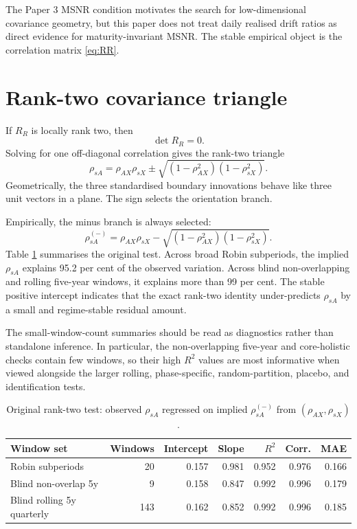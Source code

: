 \documentclass[11pt]{article}
\begin{document}
The Paper 3 MSNR condition motivates the search for low-dimensional covariance geometry, but this paper does not treat daily realised drift ratios as direct evidence for maturity-invariant MSNR. The stable empirical object is the correlation matrix \eqref{eq:RR}.

\section{Rank-two covariance triangle}

If $R_R$ is locally rank two, then
\begin{equation}
 \det R_R=0.
\end{equation}
Solving for one off-diagonal correlation gives the rank-two triangle
\begin{equation}
 \rho_{sA}
 =
 \rho_{AX}\rho_{sX}
 \pm
 \sqrt{(1-\rho_{AX}^2)(1-\rho_{sX}^2)}.
\label{eq:triangle_sA}
\end{equation}
Geometrically, the three standardised boundary innovations behave like three unit vectors in a plane. The sign selects the orientation branch.

Empirically, the minus branch is always selected:
\begin{equation}
 \rho_{sA}^{(-)}
 =
 \rho_{AX}\rho_{sX}
 -
 \sqrt{(1-\rho_{AX}^{2})(1-\rho_{sX}^{2})}.
\end{equation}
Table \ref{tab:rank2_sA} summarises the original test. Across broad Robin subperiods, the implied $\rho_{sA}$ explains 95.2 per cent of the observed variation. Across blind non-overlapping and rolling five-year windows, it explains more than 99 per cent. The stable positive intercept indicates that the exact rank-two identity under-predicts $\rho_{sA}$ by a small and regime-stable residual amount.

The small-window-count summaries should be read as diagnostics rather than standalone inference. In particular, the non-overlapping five-year and core-holistic checks contain few windows, so their high $R^2$ values are most informative when viewed alongside the larger rolling, phase-specific, random-partition, placebo, and identification tests.

\begin{table}[!htbp]
\centering
\small
\begin{tabular}{lrrrrrr}
\toprule
Window set & Windows & Intercept & Slope & $R^2$ & Corr. & MAE \\
\midrule
Robin subperiods & 20 & 0.157 & 0.981 & 0.952 & 0.976 & 0.166 \\
Blind non-overlap 5y & 9 & 0.158 & 0.847 & 0.992 & 0.996 & 0.179 \\
Blind rolling 5y quarterly & 143 & 0.162 & 0.852 & 0.992 & 0.996 & 0.185 \\
\bottomrule
\end{tabular}
\caption{Original rank-two test: observed $\rho_{sA}$ regressed on implied $\rho_{sA}^{(-)}$ from $(\rho_{AX},\rho_{sX})$.}
\label{tab:rank2_sA}
\end{table}
\end{document}

